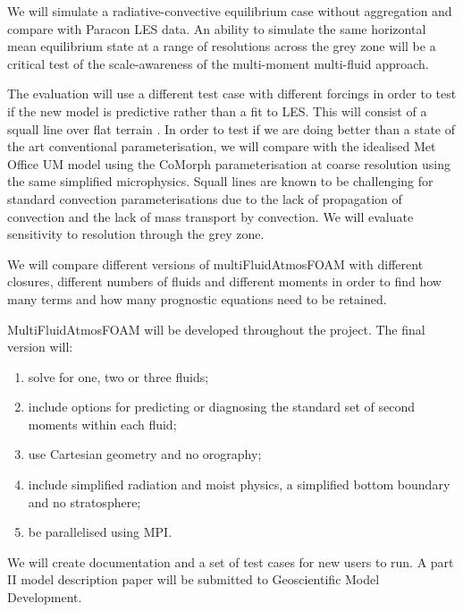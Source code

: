 \documentclass[11pt,a4paper]{article}
\begin{document}
We will simulate a radiative-convective equilibrium case without aggregation and compare with Paracon LES data. An ability to simulate the same horizontal mean equilibrium state at a range of resolutions across the grey zone will be a critical test of the scale-awareness of the multi-moment multi-fluid approach.






The evaluation will use a different test case with different forcings in order to test if the new model is predictive rather than a fit to LES. This will consist of a squall line over flat terrain \cite[]{FM06}. In order to test if we are doing better than a state of the art conventional parameterisation, we will compare with the idealised Met Office UM model using the CoMorph parameterisation at coarse resolution using the same simplified microphysics. Squall lines are known to be challenging for standard convection parameterisations \cite[e.g.][]{LCD+08} due to the lack of propagation of convection and the lack of mass transport by convection. We will evaluate sensitivity to resolution through the grey zone. 

We will compare different versions of multiFluidAtmosFOAM with different closures, different numbers of fluids and different moments in order to find how many terms and how many prognostic equations need to be retained. 


MultiFluidAtmosFOAM will be developed throughout the project. The final version will:
\begin{enumerate}
\item solve for one, two or three fluids;
\item include options for predicting or diagnosing the standard set of second moments within each fluid;
\item use Cartesian geometry and no orography;
\item include simplified radiation and moist physics, a simplified bottom boundary and no stratosphere;
\item be parallelised using MPI.
\end{enumerate}
We will create documentation and a set of test cases for new users to run. A part II model description paper will be submitted to Geoscientific Model Development.
\end{document}
